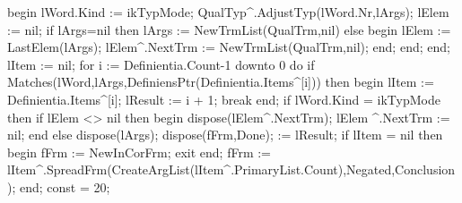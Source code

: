          begin
            lWord.Kind := ikTypMode;
            QualTyp^.AdjustTyp(lWord.Nr,lArgs);
            lElem := nil;
            if lArgs=nil then lArgs := NewTrmList(QualTrm,nil)
            else
            begin
               lElem := LastElem(lArgs);
               lElem^.NextTrm := NewTrmList(QualTrm,nil);
            end;
         end;
   end;
   lItem := nil;
   for i := Definientia.Count-1 downto 0 do
      if Matches(lWord,lArgs,DefiniensPtr(Definientia.Items^[i])) then
      begin lItem := Definientia.Items^[i]; lResult :=  i + 1; break end;
   if lWord.Kind = ikTypMode then
      if lElem <> nil then
      begin
         dispose(lElem^.NextTrm); 
         lElem ^.NextTrm := nil;
      end
      else dispose(lArgs);
   dispose(fFrm,Done);
    :=  lResult;
   if lItem = nil then begin fFrm := NewInCorFrm; exit end;
   fFrm := lItem^.SpreadFrm(CreateArgList(lItem^.PrimaryList.Count),Negated,Conclusion);
end;
\eatline
{}\nwendcode{}\nwdocspar
\nwenddocs{}\endmoddef\nwstartdeflinemarkup{}\nwenddeflinemarkup
const  = 20;

